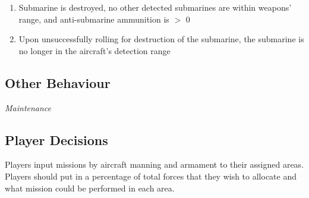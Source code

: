 \documentclass{article}
\begin{document}
\begin{itemize}
\begin{enumerate}[label=\arabic*)]
                    [Aircraft mission becomes Transit to Base]
                    \item Submarine is destroyed, no other detected submarines are within weapons' range, and anti-submarine ammunition is $>$ 0\par
                    [Aircraft mission becomes Antisubmarine searching]
                    \item Upon unsuccessfully rolling for destruction of the submarine, the submarine is no longer in the aircraft's detection range\par
                    [Aircraft mission becomes Antisubmarine searching]
                \end{enumerate}
            \end{itemize}
            
\subsection{Other Behaviour}
        \noindent \textit{Maintenance} \\
        
\subsection{Player Decisions}
    Players input missions by aircraft manning and armament to their assigned areas. Players should put in a percentage of total forces that they wish to allocate and what mission could be performed in each area.
    
\end{document}
